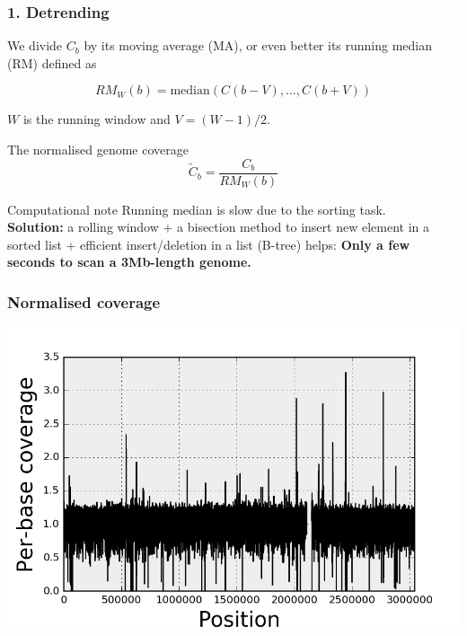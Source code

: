 \documentclass{beamer}
\begin{document}
\begin{frame}
\frametitle{1. Detrending}
 
We divide $C_b$ by its moving average (MA), or even better its 
running median (RM) defined as 

\begin{equation}
RM_W(b) = \textrm{median}\left({C(b-V), \dots , C(b+V)}\right) \nonumber
\end{equation}

$W$ is the running window and $V=(W-1)/2$.

\begin{block}{The normalised genome coverage}
\begin{equation}
\widetilde{C}_b = \frac{C_b}{RM_W(b)}  \nonumber
\end{equation}
\end{block}

\pause

\begin{block}{Computational note}
Running median is slow due to the sorting task. \\
\textbf{Solution:} a rolling window + a bisection method to insert 
new element in a sorted list + efficient insert/deletion in a 
list (B-tree) helps:  \textbf{Only a few seconds to scan a 3Mb-length genome.}
\end{block} 
\end{frame}


\begin{frame}
\frametitle{Normalised coverage}
\begin{center}
\includegraphics[height=0.9\textheight, 
    width=1\textwidth]{images/coverage_normalised.png}
\end{center} 
\end{frame}
\end{document}
